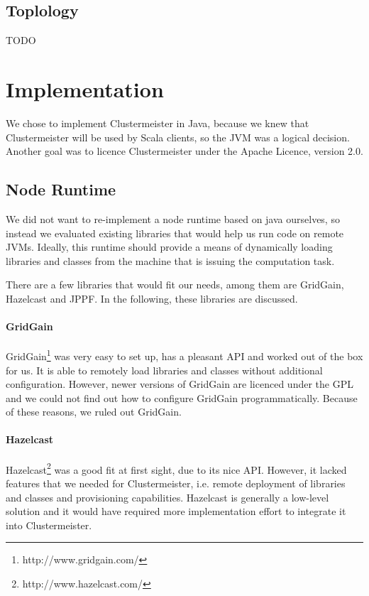 \documentclass{article}
\begin{document}
\subsection{Toplology}

TODO

\section{Implementation}
\label{implementation}

We chose to implement Clustermeister in Java, because we knew that Clustermeister will be used by Scala clients, so the JVM was a logical decision. Another goal was to licence Clustermeister under the Apache Licence, version 2.0.

\subsection{Node Runtime}

We did not want to re-implement a node runtime based on java ourselves, so instead we evaluated existing libraries that would help us run code on remote JVMs. Ideally, this runtime should provide a means of dynamically loading libraries and classes from the machine that is issuing the computation task.

There are a few libraries that would fit our needs, among them are GridGain, Hazelcast and JPPF. In the following, these libraries are discussed.

\paragraph{GridGain} GridGain\footnote{http://www.gridgain.com/} was very easy to set up, has a pleasant API and worked out of the box for us. It is able to remotely load libraries and classes without additional configuration. However, newer versions of GridGain are licenced under the GPL and we could not find out how to configure GridGain programmatically. Because of these reasons, we ruled out GridGain.

\paragraph{Hazelcast} Hazelcast\footnote{http://www.hazelcast.com/} was a good fit at first sight, due to its nice API. However, it lacked features that we needed for Clustermeister, i.e. remote deployment of libraries and classes and provisioning capabilities. Hazelcast is generally a low-level solution and it would have required more implementation effort to integrate it into Clustermeister.
\end{document}
